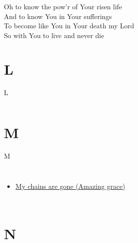 \documentclass{beamer}
\begin{document}
{\begin{frame}{}
\end{frame}

\hypertarget{Knowing You['All I once held dear']3}{}
\begin{frame}{}
\fontsize{ 18 }{ 23 }\selectfont

Oh to know the pow'r of Your risen life\\ 
And to know You in Your sufferings\\ 
To become like You in Your death my Lord\\ 
So with You to live and never die 

\end{frame}

}
\section{L}

\begin{frame}{L}
\begin{columns}

    


    


\end{columns}

\end{frame}

\section{M}

\begin{frame}{M}
\begin{columns}
    \begin{itemize}
    \item \hyperlink{Amazing grace['My chains are gone'](Tomlin)1}{My chains are gone (Amazing grace)}
\end{itemize}


\end{columns}

\end{frame}

\section{N}
\end{document}
